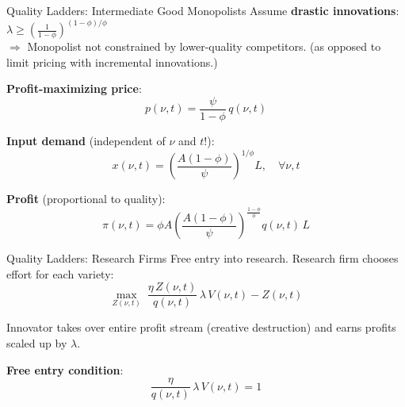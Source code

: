 \documentclass[blue]{beamer}
\begin{document}
		\begin{frame}{Quality Ladders: Intermediate Good Monopolists}
			Assume \textbf{drastic innovations}: $\lambda \geq \left(\frac{1}{1-\phi}\right)^{(1-\phi)/\phi}$\\
			$\Rightarrow$ Monopolist not constrained by lower-quality competitors. (as opposed to limit pricing with incremental innovations.)
			
	\bigskip
			\textbf{Profit-maximizing price}:
			$$
			p(\nu,t) = \frac{\psi}{1-\phi}\, q(\nu,t)
			$$
			
			\textbf{Input demand} (independent of $\nu$ and $t$!):
			\[
			x(\nu,t) = \left(\frac{A(1-\phi)}{\psi}\right)^{1/\phi} L, \quad \forall\nu,t
			\]
			
			\textbf{Profit} (proportional to quality):
			\[
			\pi(\nu,t) = \phi A\!\left(\frac{A(1-\phi)}{\psi}\right)^{\!\frac{1-\phi}{\phi}} q(\nu,t)\, L 
			\]
		\end{frame}
		
		
		\begin{frame}{Quality Ladders: Research Firms}
			Free entry into research. Research firm chooses effort for each variety:
			\[
			\max_{Z(\nu,t)}\; \frac{\eta\, Z(\nu,t)}{q(\nu,t)}\, \lambda\, V(\nu,t) - Z(\nu,t)
			\]
			
			Innovator takes over entire profit stream (creative destruction) and earns profits scaled up by $\lambda$.
			
			\textbf{Free entry condition}:
			$$
			\frac{\eta}{q(\nu,t)}\, \lambda\, V(\nu,t) = 1
			$$
		\end{frame}
		
\end{document}
